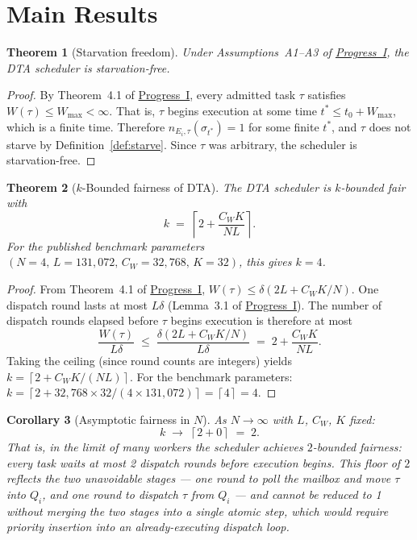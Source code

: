 \documentclass[11pt,a4paper]{report}
\newtheorem{theorem}{Theorem}[section]
\newtheorem{corollary}[theorem]{Corollary}
\newcommand{\ceil}[1]{\left\lceil #1 \right\rceil}
\begin{document}
\section{Main Results}

\begin{theorem}[Starvation freedom]
\label{thm:starve-free}
Under Assumptions~A1--A3 of \hyperref[chap:bounded_wait]{Progress~I}, the
DTA scheduler is starvation-free.
\end{theorem}

\begin{proof}
By Theorem~4.1 of \hyperref[chap:bounded_wait]{Progress~I}, every admitted task
$\tau$ satisfies $W(\tau) \leq W_{\max} < \infty$.  That is,
$\tau$ begins execution at some time $t^* \leq t_0 + W_{\max}$,
which is a finite time.  Therefore $n_{E_i, \tau}(\sigma_{t^*}) = 1$
for some finite $t^*$, and $\tau$ does not starve by
Definition~\ref{def:starve}.  Since $\tau$ was arbitrary, the
scheduler is starvation-free.
\end{proof}

\begin{theorem}[$k$-Bounded fairness of DTA]

The DTA scheduler is $k$-bounded fair with
\[
  k \;=\; \ceil{2 + \frac{C_W K}{NL}}.
\]
For the published benchmark parameters $(N=4,\,L=131{,}072,\,
C_W=32{,}768,\,K=32)$, this gives $k = 4$.
\end{theorem}

\begin{proof}
From Theorem~4.1 of \hyperref[chap:bounded_wait]{Progress~I},
$W(\tau) \leq \delta(2L + C_W K/N)$.
One dispatch round lasts at most $L\delta$ (Lemma~3.1 of
\hyperref[chap:bounded_wait]{Progress~I}).
The number of dispatch rounds elapsed before $\tau$ begins
execution is therefore at most
\[
  \frac{W(\tau)}{L\delta}
  \;\leq\;
  \frac{\delta(2L + C_W K/N)}{L\delta}
  \;=\; 2 + \frac{C_W K}{NL}.
\]
Taking the ceiling (since round counts are integers) yields
$k = \ceil{2 + C_W K/(NL)}$.  For the benchmark parameters:
$k = \ceil{2 + 32{,}768 \times 32 / (4 \times 131{,}072)} = \ceil{4} = 4$.
\end{proof}

\begin{corollary}[Asymptotic fairness in $N$]
\label{cor:asymptotic}
As $N \to \infty$ with $L$, $C_W$, $K$ fixed:
\[
  k \;\to\; \ceil{2 + 0} \;=\; 2.
\]
That is, in the limit of many workers the scheduler achieves
$2$-bounded fairness: every task waits at most 2 dispatch rounds
before execution begins.  This floor of $2$ reflects the two
unavoidable stages --- one round to poll the mailbox and move $\tau$
into $Q_i$, and one round to dispatch $\tau$ from $Q_i$ --- and
cannot be reduced to 1 without merging the two stages into a single
atomic step, which would require priority insertion into an
already-executing dispatch loop.
\end{corollary}
\end{document}
